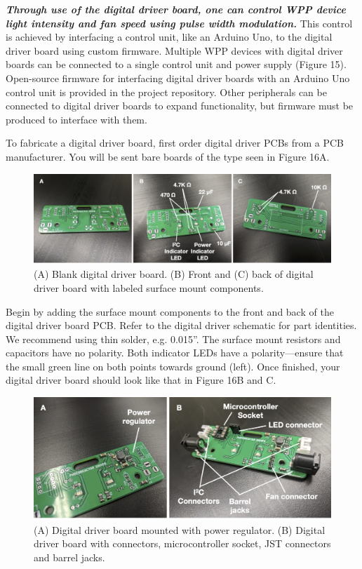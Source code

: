 \documentclass[11pt]{article}
\begin{document}
\textbf{\textit{Through use of the digital driver board, one can control WPP device light intensity and fan speed using pulse width modulation.}} This control is achieved by interfacing a control unit, like an Arduino Uno, to the digital driver board using custom firmware. Multiple WPP devices with digital driver boards can be connected to a single control unit and power supply (Figure 15). Open-source firmware for interfacing digital driver boards with an Arduino Uno control unit is provided in the project repository. Other peripherals can be connected to digital driver boards to expand functionality, but firmware must be produced to interface with them.

To fabricate a digital driver board, first order digital driver PCBs from a PCB manufacturer. You will be sent bare boards of the type seen in Figure 16A.

\begin{figure}[H]
	\centering
	\includegraphics[width=\textwidth]{"./fig16.png"}
	\caption{(A) Blank digital driver board. (B) Front and (C) back of digital driver board with labeled surface mount components.}
\end{figure}

Begin by adding the surface mount components to the front and back of the digital driver board PCB.
Refer to the digital driver schematic for part identities.
We recommend using thin solder, e.g. 0.015''.
The surface mount resistors and capacitors have no polarity.
Both indicator LEDs have a polarity---ensure that the small green line on both points towards ground (left).
Once finished, your digital driver board should look like that in Figure 16B and C.

\begin{figure}[H]
	\centering
	\includegraphics[width=\textwidth]{"./fig17.png"}
	\caption{(A) Digital driver board mounted with power regulator. (B) Digital driver board with connectors, microcontroller socket, JST connectors and barrel jacks.}
\end{figure}
\end{document}
